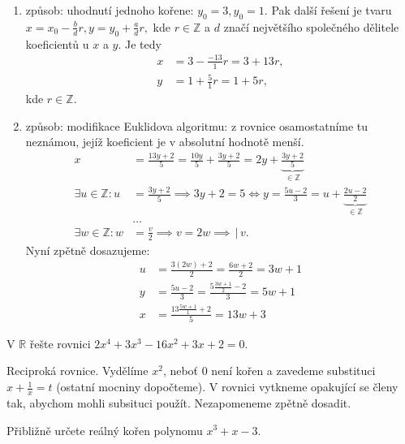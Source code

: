 \begin{reseni}
\begin{enumerate}[1.]
\item způsob: uhodnutí jednoho kořene: $y_0=3, y_0=1.$ Pak další řešení je tvaru
$x=x_0-\frac{b}{d}r, y=y_0+\frac{a}{d}r,$ kde $r \in \mathbb Z$ a $d$ značí
největšího společného dělitele koeficientů u $x$ a $y$. Je tedy
\begin{align*}
    x&=3-\frac{-13}{1}r=3+13r, \\
    y &= 1+\frac{5}{1}r = 1+5r,
\end{align*}
kde $r\in \mathbb Z.$
\item způsob: modifikace Euklidova algoritmu: z rovnice osamostatníme tu neznámou,
jejíž koeficient je v absolutní hodnotě menší.
\begin{align*}
    x &= \frac{13y+2}{5}=\frac{10y}{5}+\frac{3y+2}{5}=2y+\underbrace{\frac{3y+2}{5}}_{\in \mathbb Z}\\
    \exists u \in \mathbb Z: u &= \frac{3y+2}{5}\implies 3y+2=5 \iff y=\frac{5u-2}{3}=u+\underbrace{\frac{2u-2}{2}}_{\in \mathbb Z} \\
     & \dots \\
     \exists w \in \mathbb Z: w &= \frac{v}{2}\implies v = 2w \implies \, | \, v.
\end{align*}
Nyní zpětně dosazujeme:
\begin{align*}
    u&= \frac{3(2w)+2}{2}=\frac{6w+2}{2}=3w+1\\
    y&=\frac{5u-2}{3}=\frac{5 \frac{3w+1}{2}-2}{3}=5w+1 \\
    x &= \frac{13 \frac{5w+1}{1}+2}{5}=13w+3
\end{align*}
\end{enumerate}
\end{reseni}

\begin{priklad}
V $\mathbb R$ řešte rovnici $2x^4+3x^3-16x^2+3x+2=0.$
\end{priklad}

\begin{reseni}
Reciproká rovnice. Vydělíme $x^2$, neboť 0 není kořen a zavedeme substituci
$x+\frac{1}{x}=t$ (ostatní mocniny dopočteme). V rovnici vytkneme opakující se členy
tak, abychom mohli  subsituci použít. Nezapomeneme zpětně dosadit.
\end{reseni}

\begin{priklad}
Přibližně určete reálný kořen polynomu $x^3+x-3$.
\end{priklad}

